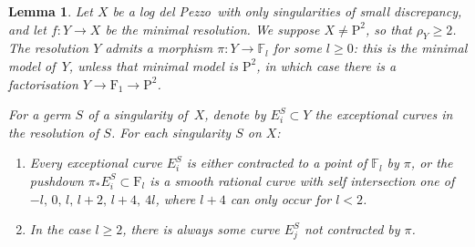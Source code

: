 \documentclass[11pt]{amsbook}
\theoremstyle{plain}
\newtheorem{lem}[thm]{Lemma}
\newcommand{\ldp}{log del Pezzo}
\newcommand{\mb}[1]{\mathbb{#1}}
\newcommand{\minres}{minimal resolution}
\newcommand{\F}{\mathrm{F}}
\renewcommand{\P}{\mathrm{P}}
\begin{document}
\begin{lem}\label{HSlem}
Let $X$ be a \ldp\ with only singularities of small discrepancy, and
let $f \colon Y \rightarrow X$ be the \minres. We suppose $X\not=\P^2$, so that $\rho_Y\ge2$.
The resolution $Y$ admits a morphism $\pi \colon Y \rightarrow \mathbb{F}_l$ for some $l\ge0$:
this is the minimal model of~$Y$, unless that minimal model
is $\P^2$, in which case there is a factorisation
$Y\rightarrow \F_1\rightarrow\P^2$.

For a germ $S$ of a singularity of~$X$, denote by
$E_i^S \subset Y$ the exceptional curves in the resolution of $S$.
For each singularity $S$ on $X$:
\begin{enumerate}
\item
Every exceptional curve $E_i^S$ is either contracted to a point of $\mb{F}_l$ by $\pi$,
or the pushdown
$\pi_* E_i^S\subset\F_l$ is a smooth rational curve with self intersection one of $-l, \,0, \, l, \, l+2, \, l+4,\ 4l $, where $l+4$ can only occur for $l<2$.
\item
In the case $l\ge2$, there is always some curve $E_j^S$ not contracted by $\pi$.
\end{enumerate}

\end{lem}
\end{document}
